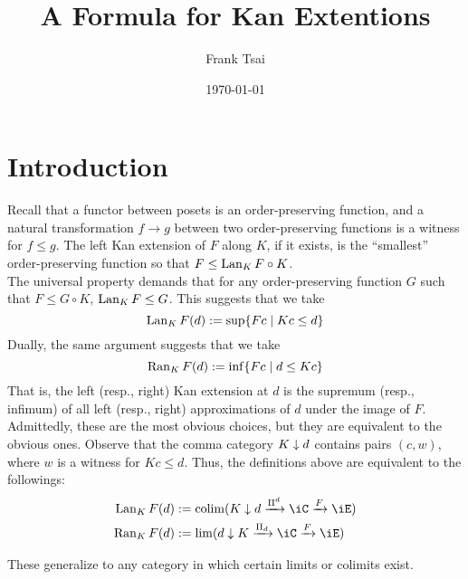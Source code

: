 \documentclass{amsart}
\title{A Formula for Kan Extentions}
\author{Frank Tsai}
\date{\today}
\begin{document}
\maketitle
\tableofcontents

\section{Introduction}
\label{sec:introduction}
Recall that a functor between posets is an order-preserving function, and a natural transformation $f \to g$ between two order-preserving functions is a witness for $f \leq g$.
The left Kan extension of $F$ along $K$, if it exists, is the ``smallest'' order-preserving function so that $F \leq \operatorname{Lan}_{K}F \circ K$.
\[\]
The universal property demands that for any order-preserving function $G$ such that $F \leq G \circ K$, $\operatorname{Lan}_{K}F \leq G$.
This suggests that we take
\[
  \operatorname{Lan}_{K}F(d) := \sup\{Fc \mid Kc \leq d\}
\]
Dually, the same argument suggests that we take
\[
  \operatorname{Ran}_{K}F(d) := \inf\{Fc \mid d \leq Kc\}
\]
That is, the left (resp., right) Kan extension at $d$ is the supremum (resp., infimum) of all left (resp., right) approximations of $d$ under the image of $F$.
Admittedly, these are the most obvious choices, but they are equivalent to the obvious ones.
Observe that the comma category $K \downarrow d$ contains pairs $(c, w)$, where $w$ is a witness for $Kc \leq d$.
Thus, the definitions above are equivalent to the followings:
\begin{align}
  \lan_{K}F(d) &:= \colim(\xMor{K \dn d}{\Pi^{d}}{\iC} \xMor{}{F}{\iE})\\
  \ran_{K}F(d) &:= \lim(\xMor{d \dn K}{\Pi_{d}}{\iC} \xMor{}{F}{\iE})
\end{align}

These generalize to any category in which certain limits or colimits exist.
\end{document}
